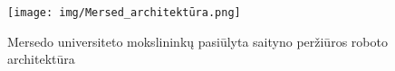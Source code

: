 \begin{figure}[ht]
\centering
\texttt{[image: img/Mersed\_architektūra.png]}
\caption{Mersedo universiteto mokslininkų pasiūlyta saityno peržiūros roboto architektūra \cite{MercedCloudBasedWebCrawler}}
\label{fig:mersed_architecture}
\end{figure}